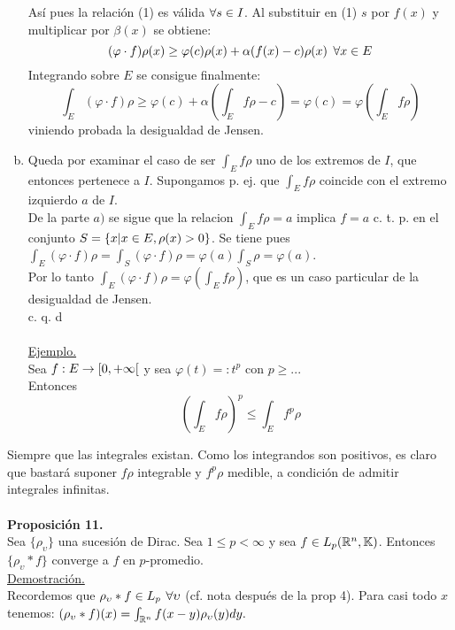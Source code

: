 \begin{enumerate}[a)]
Así pues la relación (1) es válida $\forall s \in I$. Al substituir en (1) $s$ por $f(x)$ y multiplicar por $\beta (x)$ se obtiene: 
$$
(\varphi  \cdot f) \rho (x) \geq \varphi (c) \rho (x) + \alpha  (f(x)-c)\rho (x) \phantom{s} \forall x \in E
$$
Integrando sobre $E$ se consigue finalmente:
$$
\int_E (\varphi \cdot f) \rho \geq \varphi (c) + \alpha (\int_E f\rho-c)=\varphi (c)=\varphi (\int_E f\rho)
$$
viniendo probada la desigualdad de Jensen. 
\item Queda por examinar el caso de ser $\int_E f \rho$ uno de los extremos de $I$, que entonces pertenece a $I$. Supongamos p. ej. que $\int_E f\rho$ coincide con el extremo izquierdo $a$ de $I$. \\
De la parte $a)$ se sigue que la relacion $\int_E f \rho =a$ implica $f=a$ c. t. p. en el conjunto $S= \lbrace x | x\in E, \rho (x)>0 \rbrace$. Se tiene pues $\int_E (\varphi \cdot f)\rho =\int_S (\varphi \cdot f)\rho=\varphi (a) \int_S \rho =\varphi (a)$. \\
Por lo tanto $\int_E (\varphi \cdot f) \rho = \varphi (\int_E f \rho)$, que es un caso particular de la desigualdad de Jensen.  \\
 \phantom{sssssssssssssssssssssssssssssssssss sasdasdasdasdadadssada} c. q. d \\ \\
 \underline{Ejemplo.} \\
 Sea $f:E \rightarrow [0, +\infty [$ y sea $\varphi (t)=:t^p$ con $p \geq $... \\
 Entonces 
 \begin{equation}
 (\int_E f \rho )^p \leq \int_E f^p \rho 
 \end{equation}
 \end{enumerate}
Siempre que las integrales existan. Como los integrandos son positivos, es claro que bastará suponer $f\rho$ integrable y $f^p \rho$ medible, a condición de admitir integrales infinitas. \\ \\
\textbf{Proposición 11.} \\
Sea $\lbrace \rho_\upsilon \rbrace$ una sucesión de Dirac. Sea $1 \leq p < \infty$ y sea $f \in L_p (\mathbb{R}^n, \mathbb{K})$. Entonces $\lbrace \rho_\upsilon *f \rbrace$ converge a $f$ en $p$-promedio. \\
\underline{Demostración.} \\
Recordemos que $\rho_\upsilon * f \in L_p$  $\forall \upsilon$ (cf. nota después de la prop 4). Para casi todo $x$ tenemos:
$(\rho_\upsilon *f)(x)=\int_{\mathbb{R}^n} f(x-y)\rho_\upsilon (y)dy.$ \\
